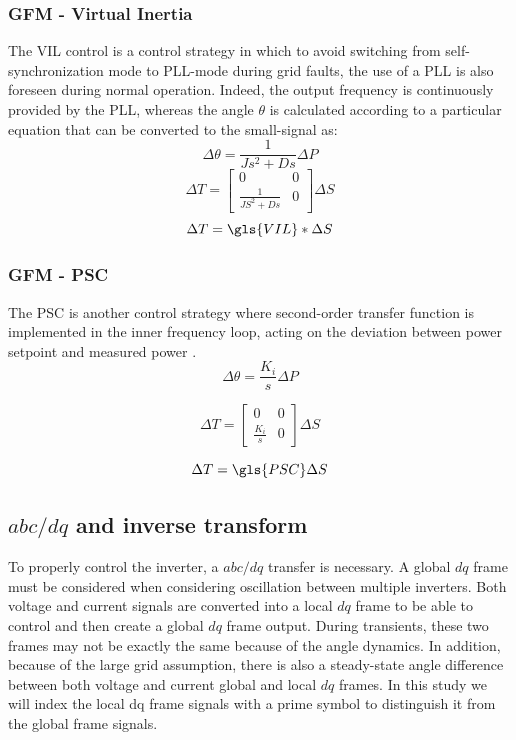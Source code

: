 \subsubsection{GFM - Virtual Inertia}
The \gls{VIL} control is a control strategy in which to avoid switching from self-synchronization mode to
PLL-mode during grid faults, the use of a PLL is also foreseen during normal operation. Indeed, the output frequency
is continuously provided by the PLL, whereas the angle $\theta$ is calculated according to a particular equation \cite{comparison2} that can be converted to the small-signal as:
\begin{equation}
\Delta \theta=\frac{1}{Js^2+Ds}\Delta P
\end{equation}
\begin{equation}
 \Delta T=\begin{bmatrix}0 & 0 \\ \frac{1}{JS^2+Ds} &  0\end{bmatrix}\Delta S   
\end{equation}
\begin{equation}
\Delta T=\gls{VIL}*\Delta S
\end{equation}

\subsubsection{GFM - PSC}
The \gls{PSC} is another control strategy where second-order transfer function is implemented in the inner frequency loop, acting on the deviation between power
setpoint and measured power \cite{comparison2}.
\begin{equation}
\Delta \theta=\frac{K_i}{s}\Delta P
\end{equation}

\begin{equation}
 \Delta T=\begin{bmatrix}0 & 0 \\ \frac{K_i}{s} &  0\end{bmatrix}\Delta S   
\end{equation}

\begin{equation}
\Delta T=\gls{PSC}\Delta S
\end{equation}


\subsection{$abc/dq$ and inverse transform}\label{dq}
To properly control the inverter, a $abc/dq$ transfer is necessary. A global $dq$ frame must be considered when considering oscillation between multiple inverters. Both voltage and current signals are converted into a local $dq$ frame to be able to control and then create a global $dq$ frame output. During transients, these two frames may not be exactly the same because of the angle dynamics. In addition, because of the large grid assumption, there is also a steady-state angle difference between both voltage and current global and local $dq$ frames. In this study we will index the local dq frame signals with a prime symbol to distinguish it from the global frame signals.
